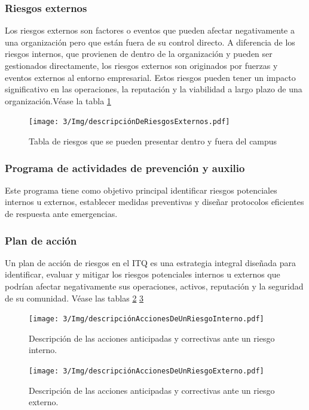     \subsubsection{Riesgos externos}
    
    Los riesgos externos son factores o eventos que pueden afectar negativamente a una organización pero que están fuera de su control directo. A diferencia de los riesgos internos, que provienen de dentro de la organización y pueden ser gestionados directamente, los riesgos externos son originados por fuerzas y eventos externos al entorno empresarial. Estos riesgos pueden tener un impacto significativo en las operaciones, la reputación y la viabilidad a largo plazo de una organización.Véase la tabla \ref{fig:tabla de riesgos externos}
    \begin{figure}[H]
        \centering
        \texttt{[image: 3/Img/descripciónDeRiesgosExternos.pdf]}
        \caption{Tabla de riesgos que se pueden presentar dentro y fuera del campus} 
        \label{fig:tabla de riesgos externos}
    \end{figure}
    \subsubsection{Programa de actividades de prevención y auxilio}
    
    Este programa tiene como objetivo principal identificar riesgos potenciales internos u externos, establecer medidas preventivas y diseñar protocolos eficientes de respuesta ante emergencias.
    \subsubsection{Plan de acción}
    
    Un plan de acción de riesgos en el ITQ es una estrategia integral diseñada para identificar, evaluar y mitigar los riesgos potenciales internos u externos que podrían afectar negativamente sus operaciones, activos, reputación y la seguridad de su comunidad. Véase las  tablas \ref{fig:descripciónAccionesDeUnRiesgoInterno} \ref{fig:descripciónAccionesDeUnRiesgoExterno}
    \begin{figure}[H]
        \centering
        \texttt{[image: 3/Img/descripciónAccionesDeUnRiesgoInterno.pdf]}
        \caption{Descripción de las acciones anticipadas y correctivas ante un riesgo interno.} 
        \label{fig:descripciónAccionesDeUnRiesgoInterno}
    \end{figure}
    \begin{figure}[H]
        \centering
        \texttt{[image: 3/Img/descripciónAccionesDeUnRiesgoExterno.pdf]}
        \caption{Descripción de las acciones anticipadas y correctivas ante un riesgo externo.} 
        \label{fig:descripciónAccionesDeUnRiesgoExterno}
    \end{figure}
